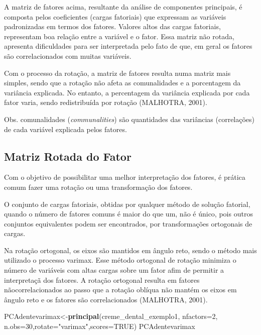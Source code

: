 \documentclass[12pt,brazil,]{book}
\newenvironment{Shaded}{\begin{snugshade}}{\end{snugshade}}
\newcommand{\DataTypeTok}[1]{\textcolor[rgb]{0.13,0.29,0.53}{#1}}
\newcommand{\DecValTok}[1]{\textcolor[rgb]{0.00,0.00,0.81}{#1}}
\newcommand{\KeywordTok}[1]{\textcolor[rgb]{0.13,0.29,0.53}{\textbf{#1}}}
\newcommand{\NormalTok}[1]{#1}
\newcommand{\OtherTok}[1]{\textcolor[rgb]{0.56,0.35,0.01}{#1}}
\newcommand{\StringTok}[1]{\textcolor[rgb]{0.31,0.60,0.02}{#1}}
\begin{document}
A matriz de fatores acima, resultante da análise de componentes
principais, é composta pelos coeficientes (cargas fatoriais) que
expressam as variáveis padronizadas em termos dos fatores. Valores altos
das cargas fatoriais, representam boa relação entre a variável e o
fator. Essa matriz não rotada, apresenta dificuldades para ser
interpretada pelo fato de que, em geral os fatores são correlacionados
com muitas variáveis.

Com o processo da rotação, a matriz de fatores resulta numa matriz mais
simples, sendo que a rotação não afeta as comunalidades e a porcentagem
da variância explicada. No entanto, a percentagem da variância explicada
por cada fator varia, sendo redistribuída por rotação (MALHOTRA, 2001).

Obs. comunalidades (\emph{communalities}) são quantidades das variâncias
(correlações) de cada variável explicada pelos fatores.

\hypertarget{matriz-rotada-do-fator}{%
\subsection{Matriz Rotada do Fator}\label{matriz-rotada-do-fator}}

Com o objetivo de possibilitar uma melhor interpretação dos fatores, é
prática comum fazer uma rotação ou uma transformação dos fatores.

O conjunto de cargas fatoriais, obtidas por qualquer método de solução
fatorial, quando o número de fatores comuns é maior do que um, não é
único, pois outros conjuntos equivalentes podem ser encontrados, por
transformações ortogonais de cargas.

Na rotação ortogonal, os eixos são mantidos em ângulo reto, sendo o
método mais utilizado o processo varimax. Esse método ortogonal de
rotação minimiza o número de variáveis com altas cargas sobre um fator
afim de permitir a interpretaçã dos fatores. A rotação ortogonal resulta
em fatores nãocorrelacionados ao passo que a rotação oblíqua não mantém
os eixos em ângulo reto e os fatores são correlacionados (MALHOTRA,
2001).

\begin{Shaded}
\begin{Highlighting}[]
\NormalTok{PCAdentevarimax<-}\KeywordTok{principal}\NormalTok{(creme_dental_exemplo1, }\DataTypeTok{nfactors=}\DecValTok{2}\NormalTok{,}
            \DataTypeTok{n.obs=}\DecValTok{30}\NormalTok{,}\DataTypeTok{rotate=}\StringTok{"varimax"}\NormalTok{,}\DataTypeTok{scores=}\OtherTok{TRUE}\NormalTok{)}
\NormalTok{PCAdentevarimax}
\end{Highlighting}
\end{Shaded}
\end{document}
